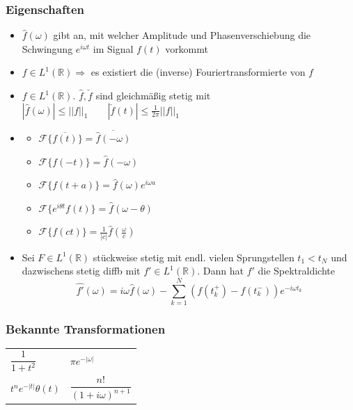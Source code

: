 \begin{sectionbox}
    \subsubsection{Eigenschaften}
    \begin{itemize}
        \item $\hat f(\omega)$ gibt an, mit welcher Amplitude und Phasenverschiebung die Schwingung $e^{i\omega t}$ im Signal $f(t)$ vorkommt
        \item $f\in L^1(\mathbb R) \Longrightarrow$ es existiert die (inverse) Fouriertransformierte von $f$
        \item $f\in L^1(\mathbb R)$. $\hat f, \check f$ sind gleichmäßig stetig mit \\
              $|\hat f(\omega)| \le ||f||_1 \qquad |\check f(t)| \le \frac{1}{2\pi}||f||_1$
        \item \begin{itemize}
                  \item $\mathcal F\{\overline{f(t)}\}=\overline{\hat f(-\omega)}$
                  \item $\mathcal F\{f(-t)\}=\hat f(-\omega)$
                  \item $\mathcal F\{f(t+a)\}=\hat f(\omega)e^{i\omega a}$
                  \item $\mathcal F\{e^{i\theta t}f(t)\}=\hat f(\omega - \theta)$
                  \item $\mathcal F\{f(ct)\}=\frac{1}{|c|}\hat f(\frac{\omega}{c})$
              \end{itemize}
        \item Sei $F\in L^1(\mathbb R)$ stückweise stetig mit endl. vielen Sprungstellen $t_1 < t_N$ und dazwischens stetig diffb mit $f' \in L^1(\mathbb R)$.
              Dann hat $f'$ die Spektraldichte
              \begin{equation*}
                  \hat{f'}(\omega) = i\omega \hat f(\omega) - \sum_{k=1}^{N}(f(t_k^+)-f(t_k^-))e^{-i\omega t_k}
              \end{equation*}
    \end{itemize}

    \subsubsection{Bekannte Transformationen}
    \begin{tabularx}{\columnwidth}{ll}
        $\dfrac{1}{1+t^2}$ & $\pi e^{-|\omega|}$             \\
        $t^n e^{-|t|}\theta(t)$         & $\dfrac{n!}{(1+i\omega)^{n+1}}$
    \end{tabularx}
\end{sectionbox}


